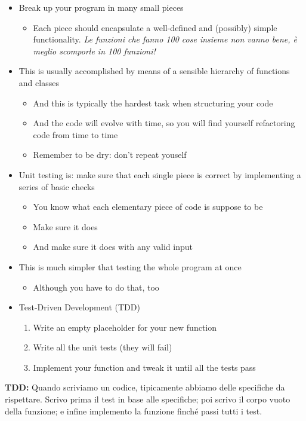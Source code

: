   \begin{itemize}
  \item Break up your program in many small pieces
    \begin{itemize}
    \item Each piece should encapsulate a well-defined and (possibly) simple
      functionality. \textit{Le funzioni che fanno 100 cose insieme non vanno bene, è meglio scomporle in 100 funzioni!}
    \end{itemize}
  \item This is usually accomplished by means of a sensible hierarchy of
    functions and classes
    \begin{itemize}
    \item And this is typically the hardest task when structuring your code
    \item And the code will evolve with time, so you will find yourself
      \alert{refactoring code} from time to time
    \item Remember to be dry: don't repeat youself
    \end{itemize}
  \item \alert{Unit testing is: make sure that each single piece is
    correct by implementing a series of basic checks}
    \begin{itemize}
    \item You know what each elementary piece of code is suppose to be
    \item Make sure it does
    \item And make sure it does with any valid input
    \end{itemize}
  \item This is much simpler that testing the whole program at once
    \begin{itemize}
    \item Although you have to do that, too
    \end{itemize}
  \item \alert{Test-Driven Development (TDD)}
    \begin{enumerate}
    \item Write an empty placeholder for your new function
    \item Write all the unit tests (they will fail)
    \item Implement your function and tweak it until all the tests pass
    \end{enumerate}
  \end{itemize}
\textbf{TDD:} Quando scriviamo un codice, tipicamente abbiamo delle specifiche da rispettare. Scrivo prima il test in base alle specifiche; poi scrivo il corpo vuoto della funzione; e infine implemento la funzione finché passi tutti i test.


